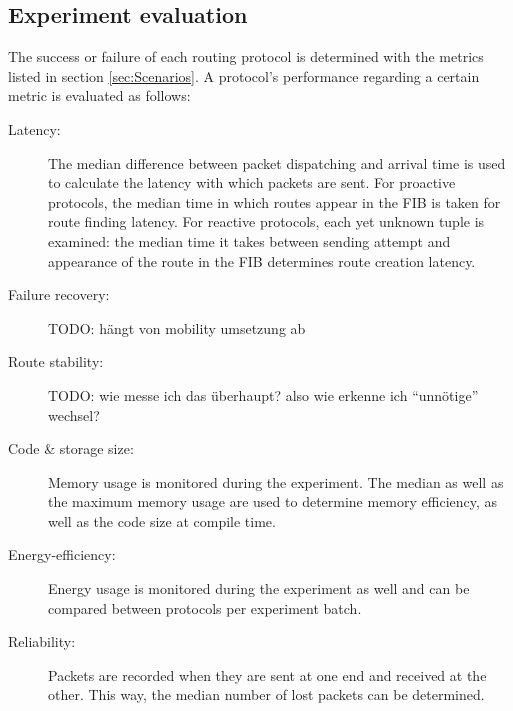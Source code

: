 \documentclass{acm_proc_article-sp}
\begin{document}
\subsection{Experiment evaluation}
\label{subsec:evaluation}
The success or failure of each routing protocol is determined with the metrics listed in section \ref{sec:Scenarios}. A protocol's performance regarding a certain metric is evaluated as follows:
\begin{description}
\item[Latency:] The median difference between packet dispatching and arrival time is used to calculate the latency with which packets are sent. For proactive protocols, the median time in which routes appear in the \gls{FIB} is taken for route finding latency. For reactive protocols, each yet unknown tuple is examined: the median time it takes between sending attempt and appearance of the route in the FIB determines route creation latency.
\item[Failure recovery:] TODO: hängt von mobility umsetzung ab
\item[Route stability:] TODO: wie messe ich das überhaupt? also wie erkenne ich “unnötige” wechsel?
\item[Code \& storage size:] Memory usage is monitored during the experiment. The median as well as the maximum memory usage are used to determine memory efficiency, as well as the code size at compile time. %
\item[Energy-efficiency:] Energy usage is monitored during the experiment as well and can be compared between protocols per experiment batch.
\item[Reliability:] Packets are recorded when they are sent at one end and received at the other. This way, the median number of lost packets can be determined.
\end{description}
\end{document}
